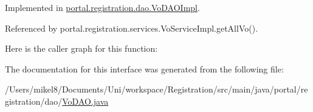Implemented in \hyperlink{classportal_1_1registration_1_1dao_1_1VoDAOImpl_af31fcf85409b93ccae3745d57844d4e3}{portal.registration.dao.VoDAOImpl}.



Referenced by portal.registration.services.VoServiceImpl.getAllVo().



Here is the caller graph for this function:




The documentation for this interface was generated from the following file:\begin{DoxyCompactItemize}
\item 
/Users/mikel8/Documents/Uni/workspace/Registration/src/main/java/portal/registration/dao/\hyperlink{VoDAO_8java}{VoDAO.java}\end{DoxyCompactItemize}
